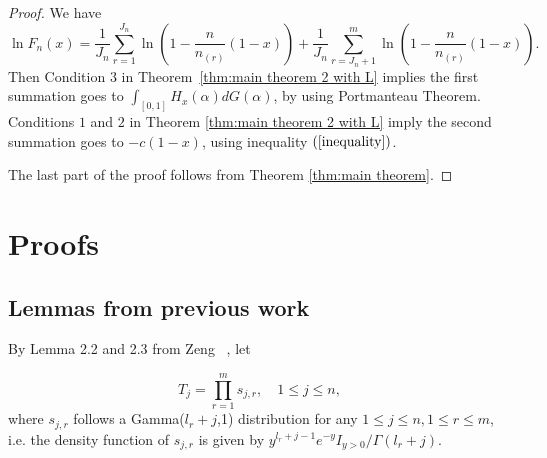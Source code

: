 \documentclass[12pt]{article}
\theoremstyle{plain}
\theoremstyle{definition}
\theoremstyle{remark}
\begin{document}
\begin{proof} We have
    \begin{equation*}
    \ln F_n(x)=\frac{1}{J_{n}} \sum_{r=1}^{J_{n}} \ln \left(1-\frac{n}{n_{(r)}}(1-x)\right)
    +\frac{1}{J_{n}} \sum_{r=J_n+1}^{m} \ln
    \left(1-\frac{n}{n_{(r)}}(1-x)\right).
    \end{equation*}
Then Condition $3$ in Theorem~\ref{thm:main theorem 2 with L}
implies the first summation goes to
    $\int_{[0,1]} H_{x}(\alpha) d G(\alpha)$, by using Portmanteau Theorem. Conditions $1$ and $2$ in Theorem \ref{thm:main theorem 2 with L}
    imply the second summation goes to $-c(1-x)$, using inequality $(\ref{inequality})$.

    The last part of the proof follows from Theorem \ref{thm:main theorem}.
\end{proof}



 \noindent



\section{Proofs}

\subsection{Lemmas from previous work}
By Lemma 2.2 and 2.3 from Zeng ~\cite{zeng2017}, let

\begin{equation*}
T_{j}=\prod_{r=1}^{m} s_{j, r}, \quad 1 \leq j \leq n,
\end{equation*}
where $s_{j,r}$ follows a Gamma($l_r+j$,1) distribution for any $1 \leq j \leq n, 1 \leq r \leq m$, i.e. the density function of $s_{j,r}$ is given by $y^{l_{r}+j-1} e^{-y} I_{y>0} / \Gamma\left(l_{r}+j\right)$.\\
\end{document}
